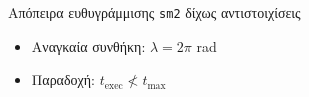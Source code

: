 \begin{frame}{Απόπειρα ευθυγράμμισης \texttt{sm2} δίχως αντιστοιχίσεις}

  \begin{itemize}
    \item Αναγκαία συνθήκη: $\lambda = 2\pi$ rad
    \item Παραδοχή: $t_{\text{exec}} \nless t_{\max}$
  \end{itemize}

\end{frame}
